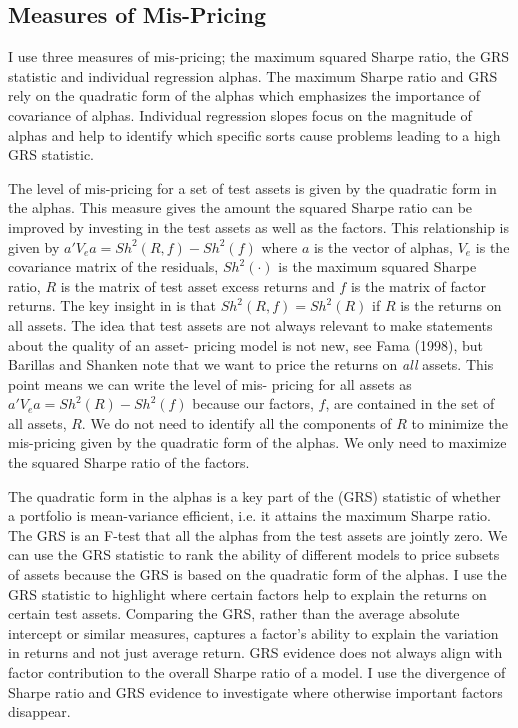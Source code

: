 
\subsection{Measures of Mis-Pricing}

I use three measures of mis-pricing; the maximum squared Sharpe ratio, the GRS statistic
and individual regression alphas. The maximum Sharpe ratio and GRS rely on the quadratic
form of the alphas which emphasizes the importance of covariance of alphas. Individual
regression slopes focus on the magnitude of alphas and help to identify which specific
sorts cause problems leading to a high GRS statistic.

The level of mis-pricing for a set of test assets is given by the quadratic form in the
alphas. This measure gives the amount the squared Sharpe ratio can be improved by
investing in the test assets as well as the factors. This relationship is given by
$a'V_ea=Sh^2\left(R,f\right)-Sh^2\left(f\right)$ where $a$ is the vector of alphas, $V_e$
is the covariance matrix of the residuals, $Sh^2\left(\cdot\right)$ is the maximum squared
Sharpe ratio, $R$ is the matrix of test asset excess returns and $f$ is the matrix of
factor returns. The key insight in \textcite{barillas2016alpha} is that
$Sh^2\left(R,f\right)=Sh^2\left(R\right)$ if $R$ is the returns on all assets. The idea
that test assets are not always relevant to make statements about the quality of an asset-
pricing model is not new, see Fama (1998), but Barillas and Shanken note that we want to
price the returns on \emph{all} assets. This point means we can write the level of mis-
pricing for all assets as $a'V_ea=Sh^2\left(R\right)-Sh^2\left(f\right)$ because our
factors, $f$, are contained in the set of all assets, $R$. We do not need to identify all
the components of $R$ to minimize the mis-pricing given by the quadratic form of the
alphas. We only need to maximize the squared Sharpe ratio of the factors.

The quadratic form in the alphas is a key part of the \textcite{gibbons1989test} (GRS)
statistic of whether a portfolio is mean-variance efficient, i.e. it attains the maximum
Sharpe ratio. The GRS is an F-test that all the alphas from the test assets are jointly
zero. We can use the GRS statistic to rank the ability of different models to price
subsets of assets because the GRS is based on the quadratic form of the alphas. I use the
GRS statistic to highlight where certain factors help to explain the returns on certain
test assets. Comparing the GRS, rather than the average absolute intercept or similar
measures, captures a factor’s ability to explain the variation in returns and not just
average return. GRS evidence does not always align with factor contribution to the overall
Sharpe ratio of a model. I use the divergence of Sharpe ratio and GRS evidence to
investigate where otherwise important factors disappear.

